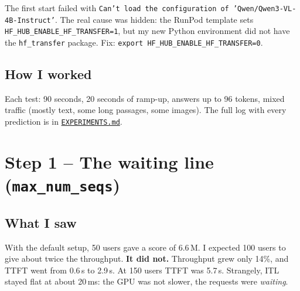 \documentclass[10pt,a4paper]{article}
\newcommand{\repo}{https://github.com/himanshu1573/qwen-vl-inference-arena}
\newcommand{\file}[1]{\href{\repo/blob/main/#1}{\nolinkurl{#1}}}
\begin{document}
\begin{note}
The first start failed with \texttt{Can't load the configuration of 'Qwen/Qwen3-VL-4B-Instruct'}. The real cause was hidden: the RunPod template sets \texttt{HF\_HUB\_ENABLE\_HF\_TRANSFER=1}, but my new Python environment did not have the \texttt{hf\_transfer} package. Fix: \texttt{export HF\_HUB\_ENABLE\_HF\_TRANSFER=0}.
\end{note}

\subsection{How I worked}
\begin{center}
\end{center}
Each test: 90 seconds, 20 seconds of ramp-up, answers up to 96 tokens, mixed traffic (mostly text, some long passages, some images). The full log with every prediction is in \file{EXPERIMENTS.md}.

\section{Step 1 -- The waiting line (\texttt{max\_num\_seqs})}
\subsection{What I saw}
With the default setup, 50 users gave a score of 6.6\,M. I expected 100 users to give about twice the throughput. \textbf{It did not.} Throughput grew only 14\%, and TTFT went from 0.6\,s to 2.9\,s. At 150 users TTFT was 5.7\,s. Strangely, ITL stayed flat at about 20\,ms: the GPU was not slower, the requests were \emph{waiting}.
\end{document}
